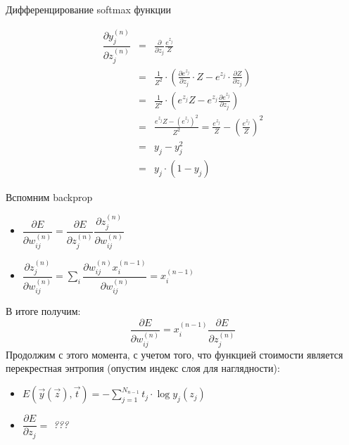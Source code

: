 \documentclass[10pt]{beamer}
\begin{document}
\begin{frame}{Дифференцирование softmax функции}

\begin{eqnarray*}
\dfrac{\partial y^{(n)}_j}{\partial z^{(n)}_j} &=& \frac{\partial}{\partial z_j} \frac{e^{z_j}}{Z} \\
&=& \frac{1}{Z^2} \cdot \left( \frac{\partial e^{z_j}}{\partial z_j}\cdot Z - e^{z_j}\cdot \frac{\partial Z}{\partial z_j}\right) \\
&=& \frac{1}{Z^2} \cdot \left( e^{z_j} Z - e^{z_j}\frac{\partial e^{z_j}}{\partial z_j}\right) \\
&=& \frac{e^{z_j}Z - \left( e^{z_j} \right)^2}{Z^2} = \frac{e^{z_j}}{Z} - \left( \frac{e^{z_j}}{Z} \right)^2 \\
&=& y_j - y_j^2 \\
&=& y_j\cdot (1 - y_j)
\end{eqnarray*}

\end{frame}


\begin{frame}{Вспомним backprop}


\begin{itemize}
	\item $\dfrac{\partial E}{\partial w^{(n)}_{ij}} = \dfrac{\partial E}{\partial z^{(n)}_j} \dfrac{\partial z^{(n)}_j}{\partial w^{(n)}_{ij}}$
	\item $\dfrac{\partial z^{(n)}_j}{\partial w^{(n)}_{ij}} = \sum_i \dfrac{\partial w^{(n)}_{ij} x_i^{(n - 1)}}{\partial w^{(n)}_{ij}} = x_i^{(n - 1)}$
\end{itemize}
В итоге получим: 
\begin{equation}\label{eq:de_dw}
	\dfrac{\partial E}{\partial w^{(n)}_{ij}} = x_i^{(n - 1)} \dfrac{\partial E}{\partial z^{(n)}_j}
\end{equation}
Продолжим с этого момента, с учетом того, что функцией стоимости является перекрестная энтропия (опустим индекс слоя для наглядности):
\begin{itemize}
	\item $E(\vec y\left(\vec z\right), \vec t) = -\sum_{j = 1}^{N_{n - 1}} t_j \cdot \log y_j (z_j)$
	\item $\dfrac{\partial E}{\partial z_j} = $ \textit{???}
\end{itemize}

\end{frame}
\end{document}
